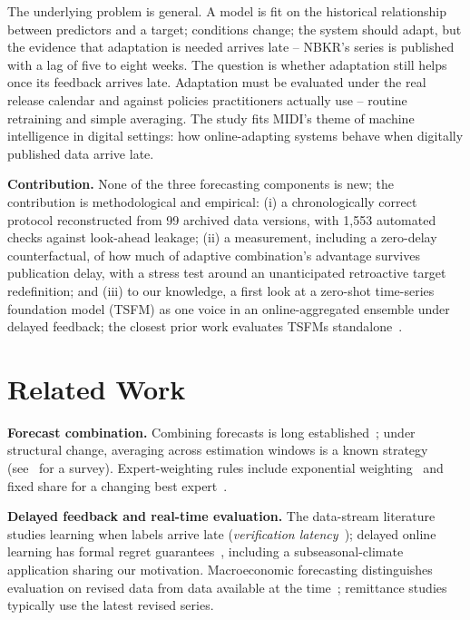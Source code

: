 \documentclass[runningheads]{llncs}
\begin{document}
The underlying problem is general. A model is fit on the historical relationship between
predictors and a target; conditions change; the system should adapt, but the evidence that
adaptation is needed arrives late -- NBKR's series is published with a lag of five to eight weeks.
The question is whether adaptation still helps once its feedback arrives late. Adaptation must be
evaluated under the real release calendar and against policies practitioners actually use --
routine retraining and simple averaging. The study fits MIDI's theme of machine intelligence in
digital settings: how online-adapting systems behave when digitally published data arrive late.

\textbf{Contribution.} None of the three forecasting components is new; the contribution is
methodological and empirical: (i) a chronologically correct protocol reconstructed from 99 archived
data versions, with 1{,}553 automated checks against look-ahead leakage; (ii) a measurement, including a zero-delay counterfactual, of how much of adaptive
combination's advantage survives publication delay, with a stress test around an unanticipated
retroactive target redefinition; and (iii) to our knowledge, a first look at a zero-shot
time-series foundation model (TSFM) as one voice in an online-aggregated ensemble under delayed
feedback; the closest prior work evaluates TSFMs standalone~\cite{jetwiriyanon2025tsfmecon}.

\section{Related Work}

\textbf{Forecast combination.} Combining forecasts is long
established~\cite{bates1969combination,timmermann2006forecast}; under structural change, averaging
across estimation windows is a known strategy~\cite{pesaran2007selection}
(see~\cite{rossi2021forecasting} for a survey). Expert-weighting rules include exponential
weighting~\cite{cesabianchi2006prediction} and fixed share for a changing best
expert~\cite{herbster1998tracking}.

\textbf{Delayed feedback and real-time evaluation.} The data-stream literature studies learning
when labels arrive late (\emph{verification latency}~\cite{gama2014survey}); delayed online
learning has formal regret guarantees~\cite{joulani2013online,flaspohler2021online}, including a
subseasonal-climate application sharing our motivation. Macroeconomic forecasting
distinguishes evaluation on revised data from data available at the
time~\cite{croushore2001realtime}; remittance studies typically use the latest revised series.
\end{document}
